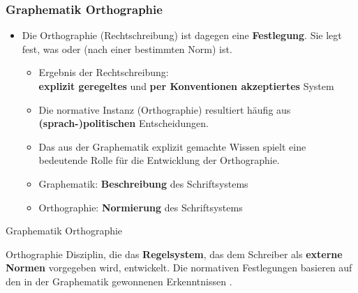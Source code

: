 \begin{frame}
\frametitle{Graphematik \vs Orthographie}

\begin{itemize}
	\item Die Orthographie (Rechtschreibung) ist dagegen eine \textbf{ Festlegung}. Sie legt fest, was \textbf{} oder \textbf{} (nach einer bestimmten Norm) ist.
	
	\begin{itemize}
		\item Ergebnis der Rechtschreibung:\\
                      \textbf{explizit geregeltes} und \textbf{per Konventionen akzeptiertes} System
		
		\item Die normative Instanz (Orthographie) resultiert häufig aus \textbf{(sprach-)politischen} Entscheidungen.
		
		\item Das aus der Graphematik explizit gemachte Wissen spielt eine bedeutende Rolle für die Entwicklung der Orthographie.

\pause
		
		\item Graphematik: \textbf{Beschreibung} des Schriftsystems
		
		\item Orthographie: \textbf{Normierung} des Schriftsystems
	\end{itemize}
\end{itemize}

\end{frame}


\begin{frame}{Graphematik \vs Orthographie}

\begin{block}{Orthographie}
	Disziplin, die das \textbf{Regelsystem}, das dem Schreiber als \textbf{externe Normen} vorgegeben wird, entwickelt. Die normativen Festlegungen basieren \idR auf den in der Graphematik gewonnenen Erkenntnissen \citep[vgl.][141]{Duerscheid04a}.
\end{block}

\end{frame}



